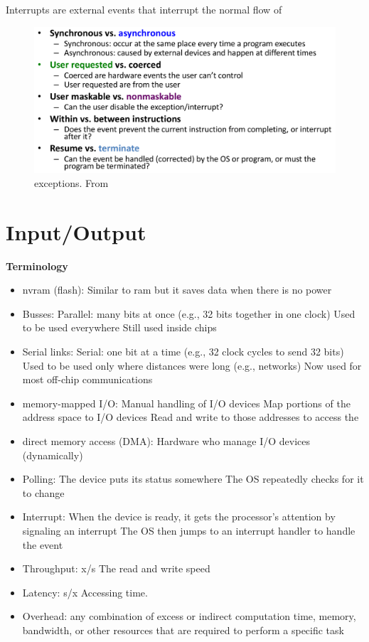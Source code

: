 Interrupts are external events that interrupt the normal flow of 

\begin{figure}[H]
    \centering
    \includegraphics[width=16cm]{image/exceptions.png} 
    \caption{exceptions. From \cite{ca}}
\end{figure}



\section{Input/Output}

\textbf{Terminology}
\begin{itemize}
\item  nvram (flash): Similar to ram but it saves data when there is no power
\item  Busses:
  Parallel: many bits at once (e.g., 32 bits together in one clock)
  Used to be used everywhere
  Still used inside chips
\item  Serial links:
  Serial: one bit at a time (e.g., 32 clock cycles to send 32 bits)
  Used to be used only where distances were long (e.g., networks)
  Now used for most off-chip communications
\item  memory-mapped I/O:
  Manual handling of I/O devices
  Map portions of the address space to I/O devices
  Read and write to those addresses to access the 
\item  direct memory access (DMA):
  Hardware who manage I/O devices (dynamically)
\item  Polling:
  The device puts its status somewhere
  The OS repeatedly checks for it to change
\item  Interrupt:
  When the device is ready, it gets the processor’s attention by signaling an interrupt
  The OS then jumps to an interrupt handler to handle the event
\item  Throughput: x/s
  The read and write speed
\item  Latency: s/x
  Accessing time.
\item  Overhead:
  any combination of excess or 
  indirect computation time, memory, bandwidth,
  or other resources that are required to perform a specific task
\end{itemize}



